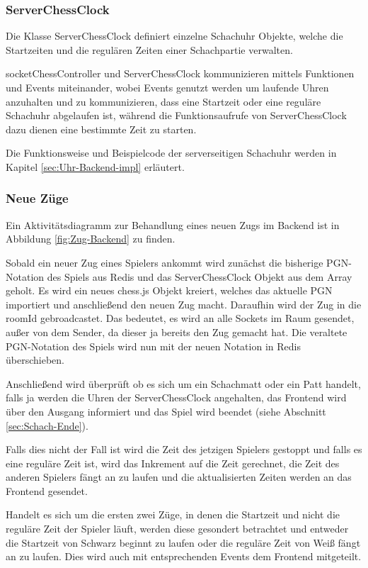 \subsubsection{ServerChessClock}
Die Klasse ServerChessClock definiert einzelne Schachuhr Objekte, welche die Startzeiten und die regulären Zeiten einer Schachpartie verwalten.

socketChessController und ServerChessClock kommunizieren mittels Funktionen und Events miteinander, wobei Events genutzt werden um laufende Uhren anzuhalten und zu kommunizieren, dass eine Startzeit oder eine reguläre Schachuhr abgelaufen ist, während die Funktionsaufrufe von ServerChessClock dazu dienen eine bestimmte Zeit zu starten.

Die Funktionsweise und Beispielcode der serverseitigen Schachuhr werden in Kapitel \ref{sec:Uhr-Backend-impl} erläutert.

\subsubsection{Neue Züge}
\label{sec:Zug-Backend}
Ein Aktivitätsdiagramm zur Behandlung eines neuen Zugs im Backend ist in Abbildung \ref{fig:Zug-Backend} zu finden. 


Sobald ein neuer Zug eines Spielers ankommt wird zunächst die bisherige PGN-Notation des Spiels aus Redis und das ServerChessClock Objekt aus dem Array geholt. Es wird ein neues chess.js Objekt kreiert, welches das aktuelle PGN importiert und anschließend den neuen Zug macht. Daraufhin wird der Zug in die roomId gebroadcastet. Das bedeutet, es wird an alle Sockets im Raum gesendet, außer von dem Sender, da dieser ja bereits den Zug gemacht hat. Die veraltete PGN-Notation des Spiels wird nun mit der neuen Notation in Redis überschieben.

Anschließend wird überprüft ob es sich um ein Schachmatt oder ein Patt handelt, falls ja werden die Uhren der ServerChessClock angehalten, das Frontend wird über den Ausgang informiert und das Spiel wird beendet (siehe Abschnitt \ref{sec:Schach-Ende}). 

Falls dies nicht der Fall ist wird die Zeit des jetzigen Spielers gestoppt und falls es eine reguläre Zeit ist, wird das Inkrement auf die Zeit gerechnet, die Zeit des anderen Spielers fängt an zu laufen und die aktualisierten Zeiten werden an das Frontend gesendet.

Handelt es sich um die ersten zwei Züge, in denen die Startzeit und nicht die reguläre Zeit der Spieler läuft, werden diese gesondert betrachtet und entweder die Startzeit von Schwarz beginnt zu laufen oder die reguläre Zeit von Weiß fängt an zu laufen. Dies wird auch mit entsprechenden Events dem Frontend mitgeteilt.

